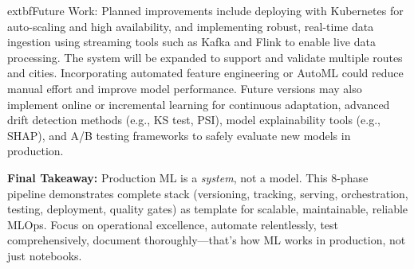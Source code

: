 \documentclass[11pt,a4paper]{article}
\begin{document}
	extbf{Future Work:} Planned improvements include deploying with Kubernetes for auto-scaling and high availability, and implementing robust, real-time data ingestion using streaming tools such as Kafka and Flink to enable live data processing. The system will be expanded to support and validate multiple routes and cities. Incorporating automated feature engineering or AutoML could reduce manual effort and improve model performance. Future versions may also implement online or incremental learning for continuous adaptation, advanced drift detection methods (e.g., KS test, PSI), model explainability tools (e.g., SHAP), and A/B testing frameworks to safely evaluate new models in production.

\textbf{Final Takeaway:} Production ML is a \textit{system}, not a model. This 8-phase pipeline demonstrates complete stack (versioning, tracking, serving, orchestration, testing, deployment, quality gates) as template for scalable, maintainable, reliable MLOps. Focus on operational excellence, automate relentlessly, test comprehensively, document thoroughly—that's how ML works in production, not just notebooks.
\end{document}
